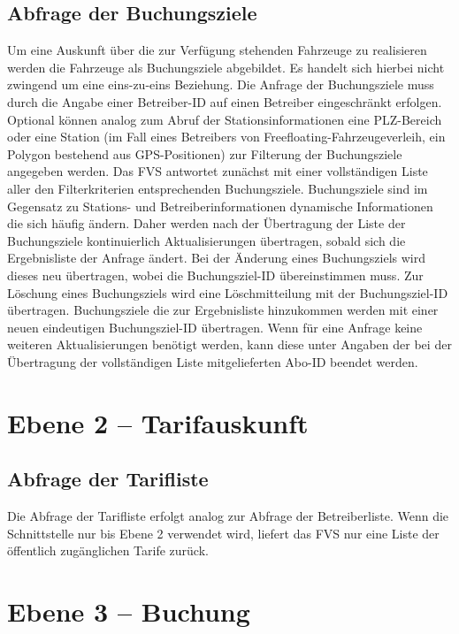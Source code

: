 \subsection{Abfrage der Buchungsziele}
 Um eine Auskunft über die zur Verfügung stehenden Fahrzeuge zu realisieren werden die Fahrzeuge als Buchungsziele abgebildet. Es handelt sich hierbei nicht zwingend um eine eins-zu-eins Beziehung. Die Anfrage der Buchungsziele muss durch die Angabe einer Betreiber-ID auf einen Betreiber eingeschränkt erfolgen. Optional können analog zum Abruf der Stationsinformationen eine PLZ-Bereich oder eine Station (im Fall eines Betreibers von Freefloating-Fahrzeugeverleih, ein Polygon bestehend aus GPS-Positionen) zur Filterung der Buchungsziele angegeben werden. Das FVS antwortet zunächst mit einer vollständigen Liste aller den Filterkriterien entsprechenden Buchungsziele. Buchungsziele sind im Gegensatz zu Stations- und Betreiberinformationen dynamische Informationen die sich häufig ändern. Daher werden nach der Übertragung der Liste der Buchungsziele kontinuierlich Aktualisierungen übertragen, sobald sich die Ergebnisliste der Anfrage ändert. Bei der Änderung eines Buchungsziels wird dieses neu übertragen, wobei die Buchungsziel-ID übereinstimmen muss. Zur Löschung eines Buchungsziels wird eine Löschmitteilung mit der Buchungsziel-ID übertragen. Buchungsziele die zur Ergebnisliste hinzukommen werden mit einer neuen eindeutigen Buchungsziel-ID übertragen. Wenn für eine Anfrage keine weiteren Aktualisierungen benötigt werden, kann diese unter Angaben der bei der Übertragung der vollständigen Liste mitgelieferten Abo-ID beendet werden.
 
\section{Ebene 2 -- Tarifauskunft}

\subsection{Abfrage der Tarifliste}
Die Abfrage der Tarifliste erfolgt analog zur Abfrage der Betreiberliste. Wenn die Schnittstelle nur bis Ebene 2 verwendet wird, liefert das FVS nur eine Liste der öffentlich zugänglichen Tarife zurück.

\section{Ebene 3 -- Buchung}

